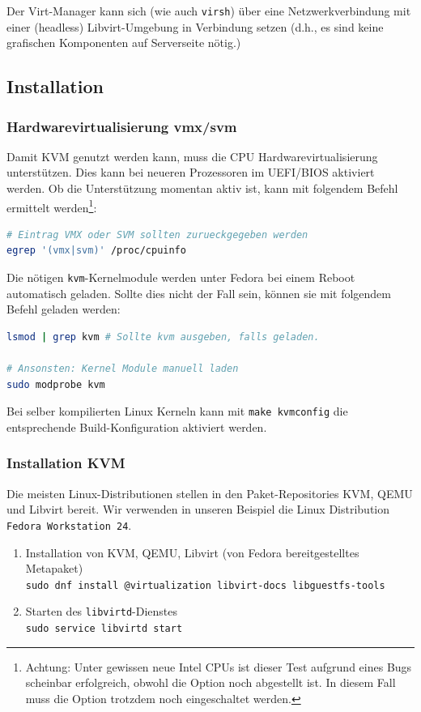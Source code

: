 Der Virt-Manager kann sich (wie auch \lstinline|virsh|) über eine Netzwerkverbindung mit einer (headless) Libvirt-Umgebung in Verbindung setzen (d.h., es sind keine grafischen Komponenten auf Serverseite nötig.)

\subsection{Installation}
\subsubsection{Hardwarevirtualisierung vmx/svm}
Damit KVM genutzt werden kann, muss die CPU Hardwarevirtualisierung unterstützen. Dies kann bei neueren Prozessoren im UEFI/BIOS aktiviert werden. Ob die Unterstützung momentan aktiv ist, kann mit folgendem Befehl ermittelt werden\footnote{Achtung: Unter gewissen neue Intel CPUs ist dieser Test aufgrund eines Bugs scheinbar erfolgreich, obwohl die Option noch abgestellt ist. In diesem Fall muss die Option trotzdem noch eingeschaltet werden.}:
\begin{lstlisting}[language=bash]
# Eintrag VMX oder SVM sollten zurueckgegeben werden
egrep '(vmx|svm)' /proc/cpuinfo
\end{lstlisting}


Die nötigen \lstinline|kvm|-Kernelmodule werden unter Fedora bei einem Reboot automatisch geladen. Sollte dies nicht der Fall sein, können sie mit folgendem Befehl geladen werden:
\begin{lstlisting}[language=bash]
lsmod | grep kvm # Sollte kvm ausgeben, falls geladen.

# Ansonsten: Kernel Module manuell laden
sudo modprobe kvm
\end{lstlisting}

Bei selber kompilierten Linux Kerneln kann mit \lstinline|make kvmconfig| die entsprechende Build-Konfiguration aktiviert werden.

\subsubsection{Installation KVM}
Die meisten Linux-Distributionen stellen in den Paket-Repositories KVM, QEMU und Libvirt bereit. Wir verwenden in unseren Beispiel die Linux Distribution \lstinline|Fedora Workstation 24|.

\begin{enumerate}
	\item Installation von KVM, QEMU, Libvirt (von Fedora bereitgestelltes Metapaket)\\ \hfill
		\lstinline|sudo dnf install @virtualization libvirt-docs libguestfs-tools|
	\item Starten des \lstinline|libvirtd|-Dienstes\\ \hfill
		\lstinline|sudo service libvirtd start|
\end{enumerate}

